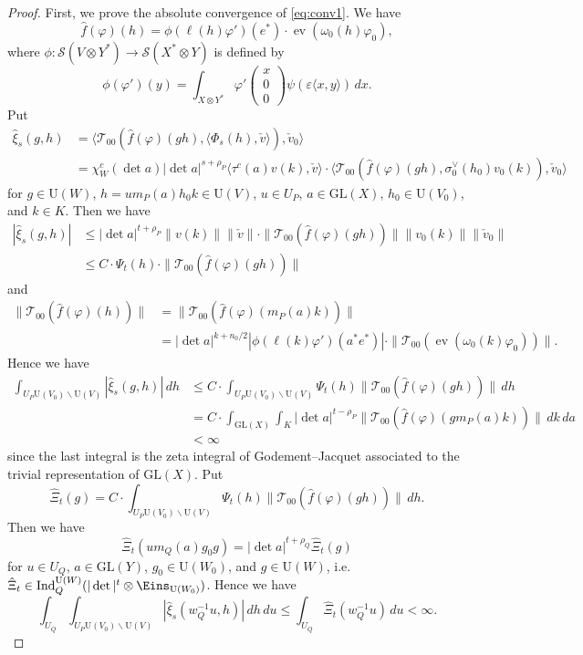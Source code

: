 \documentclass[11pt]{amsart}
\numberwithin{equation}{section}
\theoremstyle{plain}
\theoremstyle{definition}
\theoremstyle{remark}
\def\ev{\operatorname{ev}}
\def\Ind{\operatorname{Ind}}
\def\GL{\mathrm{GL}}
\def\U{\mathrm{U}}
\def\T{\mathcal{T}}
\def\s{\mathscr{S}}
\def\1{\Eins}
\begin{document}
\begin{proof}
First, we prove the absolute convergence of \eqref{eq:conv1}.
We have
\[
 \hat{f}(\varphi)(h) = \phi(\ell(h) \varphi')(e^*) \cdot \ev(\omega_0(h) \varphi_0),
\]
where $\phi:\s(V \otimes Y^*) \rightarrow \s(X^* \otimes Y)$ is defined by
\[
 \phi(\varphi')(y)
 = \int_{X \otimes Y^*} \varphi'
 \begin{pmatrix}
  x \\
  0 \\
  0
 \end{pmatrix}
 \psi(\varepsilon \langle x, y \rangle ) \, dx.
\]
Put 
\begin{align*}
 \hat{\xi}_s(g,h) & =
 \langle \T_{00}(\hat{f}(\varphi)(gh), \langle \Phi_s(h), \check{v} \rangle), \check{v}_0 \rangle \\
 & = \chi_W^c(\det a) |\det a|^{s+\rho_P} \langle \tau^c(a) v(k), \check{v} \rangle
 \cdot \langle \T_{00}(\hat{f}(\varphi)(gh), \sigma_0^\vee(h_0) v_0(k)), \check{v}_0 \rangle
\end{align*}
for $g \in \U(W)$, $h = u m_P(a) h_0 k \in \U(V)$, $u \in U_P$, $a \in \GL(X)$, $h_0 \in \U(V_0)$, and $k \in K$.
Then we have
\begin{align*}
 |\hat{\xi}_s(g,h)| & \le 
 |\det a|^{t+\rho_P} \| v(k) \| \| \check{v}\| \cdot 
 \| \T_{00}(\hat{f}(\varphi)(gh)) \| \| v_0(k) \| \| \check{v}_0 \| \\
 & \le C \cdot \Psi_t(h) \cdot \| \T_{00}(\hat{f}(\varphi)(gh)) \|
\end{align*}
and 
\begin{align*}
 \| \T_{00}(\hat{f}(\varphi)(h)) \| & = \| \T_{00}(\hat{f}(\varphi)(m_P(a) k)) \| \\
 & = |\det a|^{k+n_0/2} |\phi(\ell(k) \varphi')(a^* e^*)| \cdot \| \T_{00}(\ev(\omega_0(k) \varphi_0)) \|.
\end{align*}
Hence we have
\begin{align*}
 \int_{U_P \U(V_0) \backslash \U(V)} |\hat{\xi}_s(g,h)| \, dh 
 & \le C \cdot \int_{U_P \U(V_0) \backslash \U(V)} \Psi_t(h) \| \T_{00}(\hat{f}(\varphi)(gh)) \| \, dh \\
 & = C \cdot \int_{\GL(X)} \int_K |\det a|^{t-\rho_P} \| \T_{00}(\hat{f}(\varphi)(g m_P(a)k)) \| \, dk \, da \\
 & < \infty
\end{align*}
since the last integral is the zeta integral of Godement--Jacquet associated to the trivial representation of $\GL(X)$.
Put
\[
 \hat{\Xi}_t(g) = 
 C \cdot \int_{U_P \U(V_0) \backslash \U(V)} \Psi_t(h) \| \T_{00}(\hat{f}(\varphi)(gh)) \| \, dh.
\]
Then we have
\[
 \hat{\Xi}_t(u m_Q(a) g_0 g) = |\det a|^{t+\rho_Q} \hat{\Xi}_t(g)
\]
for $u \in U_Q$, $a \in \GL(Y)$, $g_0 \in \U(W_0)$, and $g \in \U(W)$, 
i.e.~$\hat{\Xi}_t \in \Ind^{\U(W)}_Q(|\det|^t \otimes \1_{\U(W_0)})$.
Hence we have
\[
 \int_{U_Q} \int_{U_P \U(V_0) \backslash \U(V)} |\hat{\xi}_s(w_Q^{-1} u, h)| \, dh \, du 
 \le \int_{U_Q} \hat{\Xi}_t(w_Q^{-1} u) \, du < \infty.
\]


\end{proof}
\end{document}
